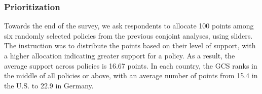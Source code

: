 



\subsubsection{Prioritization}\label{subsubsec:prioritization} %

Towards the end of the survey, we ask respondents to allocate 100 points among six randomly selected policies from the previous conjoint analyses, using sliders. The instruction was to distribute the points based on their level of support, with a higher allocation indicating greater support for a policy. %
As a result, the average support across policies is 16.67 points. %
In each country, the GCS ranks in the middle of all policies or above, with an average number of points from 15.4 in the U.S. to 22.9 in Germany.%

